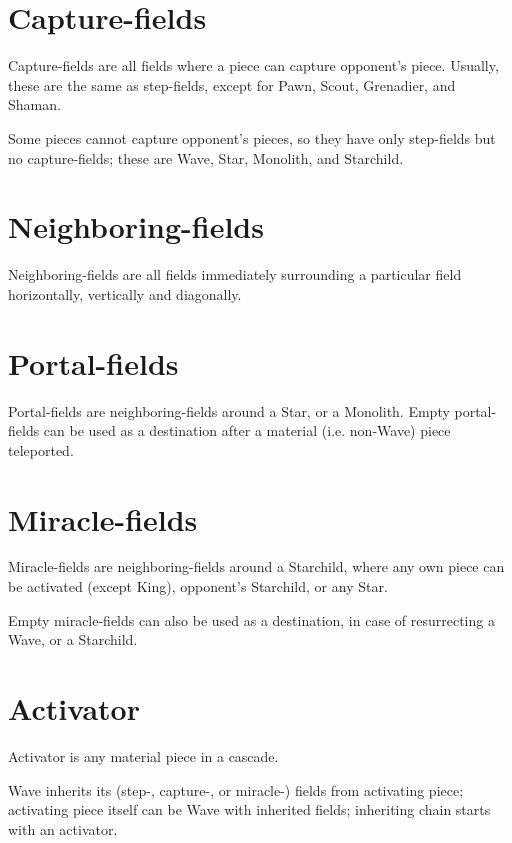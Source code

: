 \section*{Capture-fields}
\label{sec:Terms/Capture-fields}
Capture-fields are all fields where a piece can capture opponent's piece.
Usually, these are the same as step-fields, except for Pawn, Scout, Grenadier,
and Shaman.

Some pieces cannot capture opponent's pieces, so they have only step-fields
but no capture-fields; these are Wave, Star, Monolith, and Starchild.

\section*{Neighboring-fields}
\label{sec:Terms/Neighboring-fields}
Neighboring-fields are all fields immediately surrounding a particular field
horizontally, vertically and diagonally.

\section*{Portal-fields}
\label{sec:Terms/Portal-fields}
Portal-fields are neighboring-fields around a Star, or a Monolith. Empty
portal-fields can be used as a destination after a material (i.e. non-Wave)
piece teleported.

\section*{Miracle-fields}
\label{sec:Terms/Royal-fields}
Miracle-fields are neighboring-fields around a Starchild, where any own piece
can be activated (except King), opponent's Starchild, or any Star.

Empty miracle-fields can also be used as a destination, in case of resurrecting
a Wave, or a Starchild.

\section*{Activator}
\label{sec:Terms/Activator}
Activator is any material piece in a cascade.

Wave inherits its (step-, capture-, or miracle-) fields from activating piece;
activating piece itself can be Wave with inherited fields; inheriting chain
starts with an activator.

